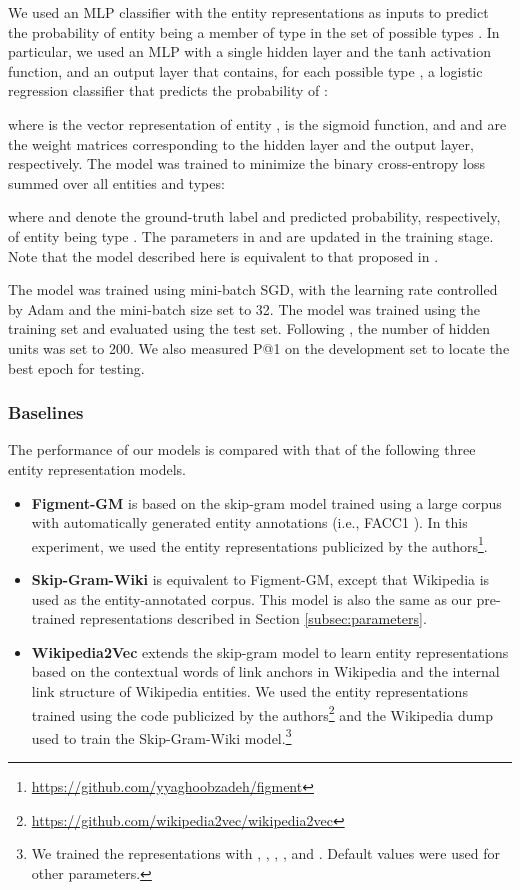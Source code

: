 \documentclass[11pt]{article}
\begin{document}
  We used an MLP classifier with the entity representations as inputs to predict the probability of entity  being a member of type  in the set of possible types .
  In particular, we used an MLP with a single hidden layer and the tanh activation function, and an output layer that contains, for each possible type , a logistic regression classifier that predicts the probability of :
  
  where  is the vector representation of entity ,  is the sigmoid function, and  and  are the weight matrices corresponding to the hidden layer and the output layer, respectively.
  The model was trained to minimize the binary cross-entropy loss summed over all entities and types:
  
  where  and  denote the ground-truth label and predicted probability, respectively, of entity  being type .
  The parameters in  and  are updated in the training stage.
  Note that the model described here is equivalent to that proposed in .

  The model was trained using mini-batch SGD, with the learning rate controlled by Adam \cite{kingma2014adam} and the mini-batch size set to 32.
  The model was trained using the training set and evaluated using the test set.
  Following , the number of hidden units was set to 200.
  We also measured P@1 on the development set to locate the best epoch for testing.

  \subsubsection*{Baselines}

  The performance of our models is compared with that of the following three entity representation models.

  \begin{itemize}
    \item \textbf{Figment-GM} \cite{yaghoobzadeh-schutze:2015:EMNLP} is based on the skip-gram model \cite{Mikolov2013,Mikolov2013a} trained using a large corpus with automatically generated entity annotations (i.e., FACC1 \cite{Gabrilovich2013}).
    In this experiment, we used the entity representations publicized by the authors\footnote{\url{https://github.com/yyaghoobzadeh/figment}}.
    \item \textbf{Skip-Gram-Wiki} is equivalent to Figment-GM, except that Wikipedia is used as the entity-annotated corpus.
    This model is also the same as our pre-trained representations described in Section \ref{subsec:parameters}.
    \item \textbf{Wikipedia2Vec} \cite{Yamada2016} extends the skip-gram model to learn entity representations based on the contextual words of link anchors in Wikipedia and the internal link structure of Wikipedia entities.
    We used the entity representations trained using the code publicized by the authors\footnote{\url{https://github.com/wikipedia2vec/wikipedia2vec}} and the Wikipedia dump used to train the Skip-Gram-Wiki model.\footnote{We trained the representations with , , , , and . Default values were used for other parameters.}
  \end{itemize}
\end{document}
